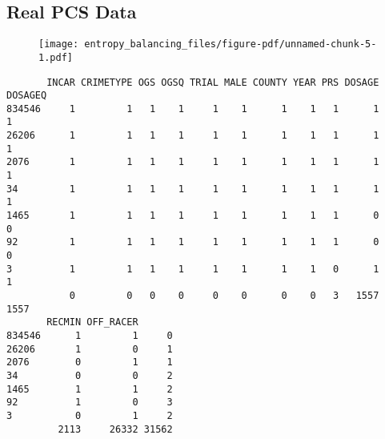 \documentclass[
  letterpaper,
  DIV=11,
  numbers=noendperiod]{scrartcl}
\newenvironment{Shaded}{\begin{snugshade}}{\end{snugshade}}
\newcommand{\AttributeTok}[1]{\textcolor[rgb]{0.40,0.45,0.13}{#1}}
\newcommand{\FunctionTok}[1]{\textcolor[rgb]{0.28,0.35,0.67}{#1}}
\newcommand{\NormalTok}[1]{\textcolor[rgb]{0.00,0.23,0.31}{#1}}
\newcommand{\OtherTok}[1]{\textcolor[rgb]{0.00,0.23,0.31}{#1}}
\newcommand{\SpecialCharTok}[1]{\textcolor[rgb]{0.37,0.37,0.37}{#1}}
\newcommand{\StringTok}[1]{\textcolor[rgb]{0.13,0.47,0.30}{#1}}
\begin{document}
\hypertarget{real-pcs-data}{%
\subsection{Real PCS Data}\label{real-pcs-data}}

\begin{Shaded}
\end{Shaded}

\begin{figure}[H]

{\centering \texttt{[image: entropy\_balancing\_files/figure-pdf/unnamed-chunk-5-1.pdf]}

}

\end{figure}

\begin{verbatim}
       INCAR CRIMETYPE OGS OGSQ TRIAL MALE COUNTY YEAR PRS DOSAGE DOSAGEQ
834546     1         1   1    1     1    1      1    1   1      1       1
26206      1         1   1    1     1    1      1    1   1      1       1
2076       1         1   1    1     1    1      1    1   1      1       1
34         1         1   1    1     1    1      1    1   1      1       1
1465       1         1   1    1     1    1      1    1   1      0       0
92         1         1   1    1     1    1      1    1   1      0       0
3          1         1   1    1     1    1      1    1   0      1       1
           0         0   0    0     0    0      0    0   3   1557    1557
       RECMIN OFF_RACER      
834546      1         1     0
26206       1         0     1
2076        0         1     1
34          0         0     2
1465        1         1     2
92          1         0     3
3           0         1     2
         2113     26332 31562
\end{verbatim}
\end{document}
